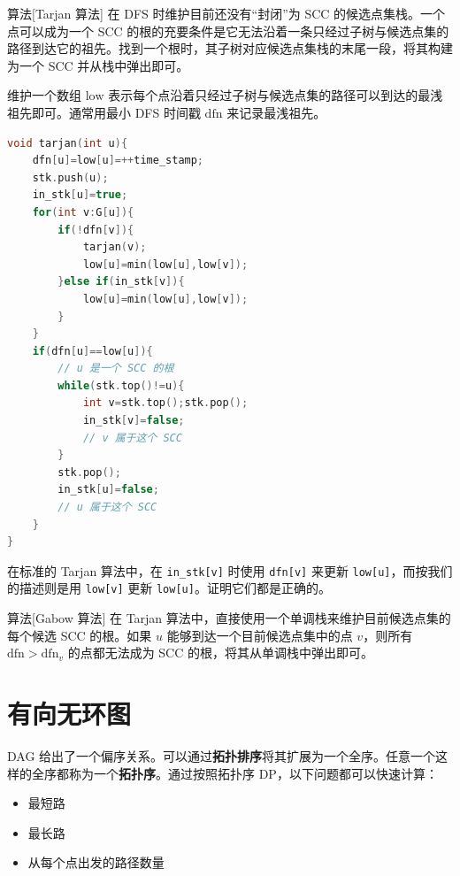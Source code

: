 \begin{descbox}{算法}[Tarjan 算法]
    在 DFS 时维护目前还没有“封闭”为 SCC 的候选点集栈。一个点可以成为一个 SCC 的根的充要条件是它无法沿着一条只经过子树与候选点集的路径到达它的祖先。找到一个根时，其子树对应候选点集栈的末尾一段，将其构建为一个 SCC 并从栈中弹出即可。

    维护一个数组 $\mathrm{low}$ 表示每个点沿着只经过子树与候选点集的路径可以到达的最浅祖先即可。通常用最小 DFS 时间戳 $\mathrm{dfn}$ 来记录最浅祖先。
\end{descbox}
\begin{lstlisting}[language=C++,caption=Tarjan 算法]
void tarjan(int u){
    dfn[u]=low[u]=++time_stamp;
    stk.push(u);
    in_stk[u]=true;
    for(int v:G[u]){
        if(!dfn[v]){
            tarjan(v);
            low[u]=min(low[u],low[v]);
        }else if(in_stk[v]){
            low[u]=min(low[u],low[v]);    
        }
    }
    if(dfn[u]==low[u]){
        // u 是一个 SCC 的根
        while(stk.top()!=u){
            int v=stk.top();stk.pop();
            in_stk[v]=false;
            // v 属于这个 SCC
        }
        stk.pop();
        in_stk[u]=false;
        // u 属于这个 SCC
    }
}
\end{lstlisting}
\begin{remark}
    在标准的 Tarjan 算法中，在 \texttt{in\_stk[v]} 时使用 \texttt{dfn[v]} 来更新 \texttt{low[u]}，而按我们的描述则是用 \texttt{low[v]} 更新 \texttt{low[u]}。证明它们都是正确的。
\end{remark}

\begin{descbox}{算法}[Gabow 算法]
    在 Tarjan 算法中，直接使用一个单调栈来维护目前候选点集的每个候选 SCC 的根。如果 $u$ 能够到达一个目前候选点集中的点 $v$，则所有 $\mathrm{dfn}>\mathrm{dfn}_v$ 的点都无法成为 SCC 的根，将其从单调栈中弹出即可。
\end{descbox}

\section{有向无环图}

DAG 给出了一个偏序关系。可以通过\textbf{拓扑排序}将其扩展为一个全序。任意一个这样的全序都称为一个\textbf{拓扑序}。通过按照拓扑序 DP，以下问题都可以快速计算：

\begin{itemize}
    \item 最短路
    \item 最长路
    \item 从每个点出发的路径数量
\end{itemize}


